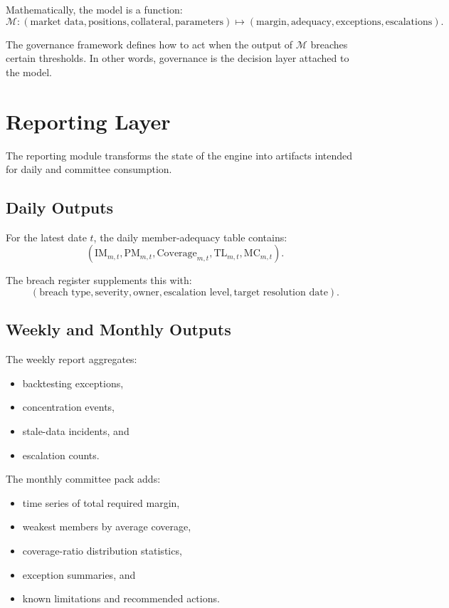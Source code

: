 \documentclass[11pt]{article}
\begin{document}
Mathematically, the model is a function:
\[
\mathcal{M}: (\text{market data}, \text{positions}, \text{collateral}, \text{parameters})
\mapsto
(\text{margin}, \text{adequacy}, \text{exceptions}, \text{escalations}).
\]

The governance framework defines how to act when the output of \(\mathcal{M}\) breaches certain thresholds. In other words, governance is the decision layer attached to the model.

\section{Reporting Layer}

The reporting module transforms the state of the engine into artifacts intended for daily and committee consumption.

\subsection{Daily Outputs}

For the latest date \(t\), the daily member-adequacy table contains:
\[
(\text{IM}_{m,t}, \text{PM}_{m,t}, \text{Coverage}_{m,t}, \text{TL}_{m,t}, \text{MC}_{m,t}).
\]

The breach register supplements this with:
\[
(\text{breach type}, \text{severity}, \text{owner}, \text{escalation level}, \text{target resolution date}).
\]

\subsection{Weekly and Monthly Outputs}

The weekly report aggregates:
\begin{itemize}
    \item backtesting exceptions,
    \item concentration events,
    \item stale-data incidents, and
    \item escalation counts.
\end{itemize}

The monthly committee pack adds:
\begin{itemize}
    \item time series of total required margin,
    \item weakest members by average coverage,
    \item coverage-ratio distribution statistics,
    \item exception summaries, and
    \item known limitations and recommended actions.
\end{itemize}
\end{document}
